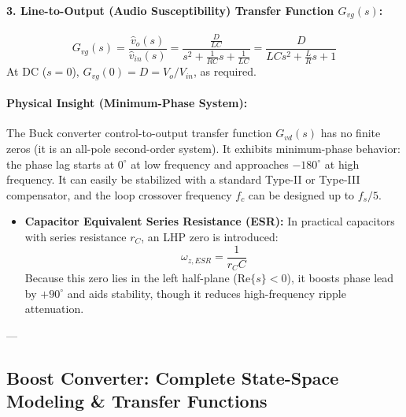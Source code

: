 \paragraph{3. Line-to-Output (Audio Susceptibility) Transfer Function $G_{vg}(s)$:}
\begin{equation}
\boxed{G_{vg}(s) = \frac{\hat{v}_o(s)}{\hat{v}_{in}(s)} = \frac{\frac{D}{LC}}{s^2 + \frac{1}{RC}s + \frac{1}{LC}} = \frac{D}{LC s^2 + \frac{L}{R} s + 1}}
\end{equation}
At DC ($s = 0$), $G_{vg}(0) = D = V_o / V_{in}$, as required.

\paragraph{Physical Insight (Minimum-Phase System):}
The Buck converter control-to-output transfer function $G_{vd}(s)$ has no finite zeros (it is an all-pole second-order system). It exhibits minimum-phase behavior: the phase lag starts at $0^\circ$ at low frequency and approaches $-180^\circ$ at high frequency. It can easily be stabilized with a standard Type-II or Type-III compensator, and the loop crossover frequency $f_c$ can be designed up to $f_s / 5$.
\begin{itemize}
  \item \textbf{Capacitor Equivalent Series Resistance (ESR):} In practical capacitors with series resistance $r_C$, an LHP zero is introduced:
  \begin{equation}
  \omega_{z,ESR} = \frac{1}{r_C C}
  \end{equation}
  Because this zero lies in the left half-plane ($\mathrm{Re}\{s\} < 0$), it boosts phase lead by $+90^\circ$ and aids stability, though it reduces high-frequency ripple attenuation.
\end{itemize}

---

\subsection{Boost Converter: Complete State-Space Modeling \& Transfer Functions}

